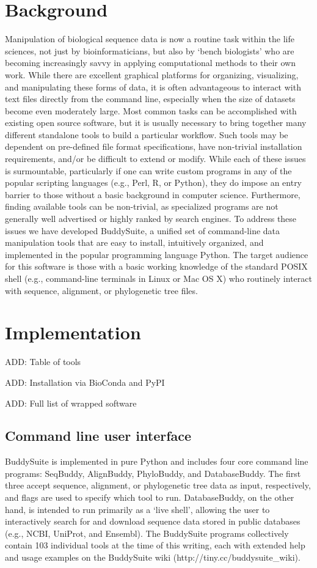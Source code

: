 \documentclass[twocolumn]{bmcart}%
\begin{document}
\section*{Background}
Manipulation of biological sequence data is now a routine task within the life sciences, not just by bioinformaticians, but also by `bench biologists' who are becoming increasingly savvy in applying computational methods to their own work. While there are excellent graphical platforms for organizing, visualizing, and manipulating these forms of data, it is often advantageous to interact with text files directly from the command line, especially when the size of datasets become even moderately large. Most common tasks can be accomplished with existing open source software, but it is usually necessary to bring together many different standalone tools to build a particular workflow. Such tools may be dependent on pre-defined file format specifications, have non-trivial installation requirements, and/or be difficult to extend or modify. While each of these issues is surmountable, particularly if one can write custom programs in any of the popular scripting languages (e.g., Perl, R, or Python), they do impose an entry barrier to those without a basic background in computer science. Furthermore, finding available tools can be non-trivial, as specialized programs are not generally well advertised or highly ranked by search engines. To address these issues we have developed BuddySuite, a unified set of command-line data manipulation tools that are easy to install, intuitively organized, and implemented in the popular programming language Python. The target audience for this software is those with a basic working knowledge of the standard POSIX shell (e.g., command-line terminals in Linux or Mac OS X) who routinely interact with sequence, alignment, or phylogenetic tree files.


\section*{Implementation}
ADD: Table of tools

ADD: Installation via BioConda and PyPI

ADD: Full list of wrapped software

\subsection*{Command line user interface}
BuddySuite is implemented in pure Python and includes four core command line programs: SeqBuddy, AlignBuddy, PhyloBuddy, and DatabaseBuddy. The first three accept sequence, alignment, or phylogenetic tree data as input, respectively, and flags are used to specify which tool to run. DatabaseBuddy, on the other hand, is intended to run primarily as a `live shell', allowing the user to interactively search for and download sequence data stored in public databases (e.g., NCBI, UniProt, and Ensembl). The BuddySuite programs collectively contain 103 individual tools at the time of this writing, each with extended help and usage examples on the BuddySuite wiki (http://tiny.cc/buddysuite\_wiki). 
\end{document}
